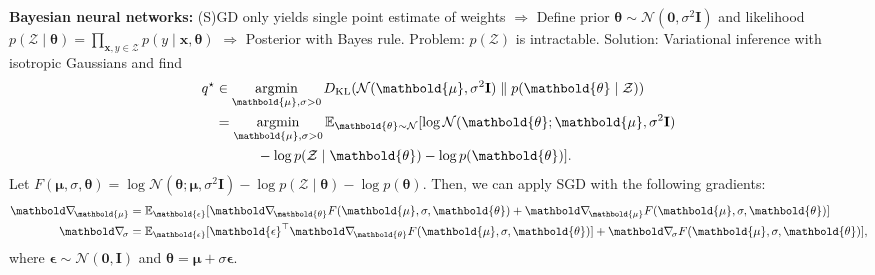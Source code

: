\documentclass[9pt]{extarticle}
\newenvironment{topic}[1]
{\textbf{\sffamily \colorbox{black}{\rlap{\textbf{\textcolor{white}{#1}}}\hspace{\linewidth}\hspace{-2\fboxsep}}}}
{}
\newenvironment{subtopic}[1]
{\textbf{\sffamily #1:}}
{}
\renewcommand{\mat}[1]{\ensuremath{\mathbf{#1}}}
\renewcommand{\vec}[1]{\ensuremath{\mathbold{#1}}}
\begin{document}
\begin{multicols*}{3}
\begin{topic}{Uncertainty quantification}
        \begin{subtopic}{Bayesian neural networks}
            (S)GD only yields single point estimate of weights $\Rightarrow$ Define prior
            $\vec{\theta} \sim \mathcal{N}(\vec{0}, \sigma^2 \mat{I})$ and likelihood $p(\mathcal{Z}
                \mid \vec{\theta}) = \prod_{\vec{x},y \in \mathcal{Z}} p(y \mid \vec{x}, \vec{\theta})$
            $\Rightarrow$ Posterior with Bayes rule. Problem: $p(\mathcal{Z})$ is intractable.
            Solution: Variational inference with isotropic Gaussians and find
            \begin{align*}
                q^\star & \in \argmin_{\vec{\mu}, \sigma > 0} D_{\mathrm{KL}} (\mathcal{N}(\vec{\mu}, \sigma^2 \mat{I}) \;\|\; p(\vec{\theta} \mid \mathcal{Z})) \\
                        & = \argmin_{\vec{\mu}, \sigma > 0} \E_{\vec{\theta} \sim \mathcal{N}} [\log \mathcal{N}(\vec{\theta}; \vec{\mu}, \sigma^2 \mat{I})      \\
                        & \quad \quad \quad - \log p(\mathcal{Z} \mid \vec{\theta}) - \log p(\vec{\theta})].
            \end{align*}
            Let $F(\vec{\mu}, \sigma, \vec{\theta}) = \log \mathcal{N}(\vec{\theta}; \vec{\mu}, \sigma^2 \mat{I}) - \log p(\mathcal{Z} \mid \vec{\theta}) - \log p(\vec{\theta})$. Then, we can apply SGD with the following gradients:
            \begin{align*}
                \grad{}{\vec{\mu}} & = \E_{\vec{\epsilon}} [\grad{F(\vec{\mu}, \sigma, \vec{\theta})}{\vec{\theta}} + \grad{F(\vec{\mu}, \sigma, \vec{\theta})}{\vec{\mu}}]                           \\
                \grad{}{\sigma}    & = \E_{\vec{\epsilon}} [\transpose{\vec{\epsilon}} \grad{F(\vec{\mu}, \sigma, \vec{\theta})}{\vec{\theta}}] + \grad{F(\vec{\mu}, \sigma, \vec{\theta})}{\sigma}],
            \end{align*}
            where $\vec{\epsilon} \sim \mathcal{N}(\vec{0}, \mat{I})$ and $\vec{\theta} = \vec{\mu} + \sigma \vec{\epsilon}$.

        \end{subtopic}


\end{topic}
\end{multicols*}
\end{document}

